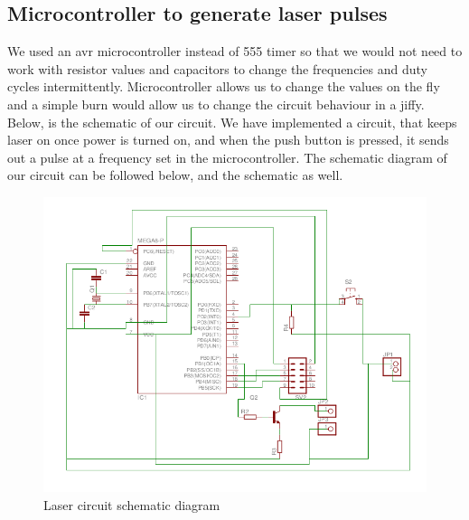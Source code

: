 \documentclass[12pt, a4paper]{article}
\begin{document}
\subsection{Microcontroller to generate laser pulses}

	We used an avr microcontroller instead of 555 timer so that we would not need to work with resistor values and capacitors to change the frequencies and duty cycles intermittently. Microcontroller allows us to change the values on the fly and a simple burn would allow us to change the circuit behaviour in a jiffy. Below, is the schematic of our circuit. We have implemented a circuit, that keeps laser on once power is turned on, and when the push button is pressed, it sends out a pulse at a frequency set in the microcontroller. The schematic diagram of our circuit can be followed below, and the schematic as well.
	

\begin{figure}[htp]
	\centering
	\includegraphics[scale=0.25]{schematic.png}
	\caption{Laser circuit schematic diagram}
	\label{}
\end{figure}
\end{document}
